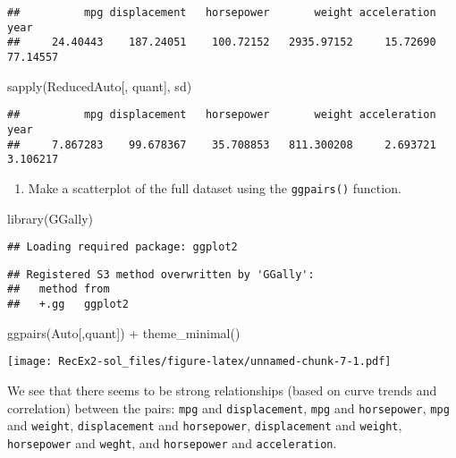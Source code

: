 \documentclass[
]{article}
\newenvironment{Shaded}{\begin{snugshade}}{\end{snugshade}}
\newcommand{\FunctionTok}[1]{\textcolor[rgb]{0.00,0.00,0.00}{#1}}
\newcommand{\NormalTok}[1]{#1}
\newcommand{\SpecialCharTok}[1]{\textcolor[rgb]{0.00,0.00,0.00}{#1}}
\providecommand{\tightlist}{%
  \setlength{\itemsep}{0pt}\setlength{\parskip}{0pt}}
\begin{document}
\begin{verbatim}
##          mpg displacement   horsepower       weight acceleration         year 
##     24.40443    187.24051    100.72152   2935.97152     15.72690     77.14557
\end{verbatim}

\begin{Shaded}
\begin{Highlighting}[]
\FunctionTok{sapply}\NormalTok{(ReducedAuto[, quant], sd)}
\end{Highlighting}
\end{Shaded}

\begin{verbatim}
##          mpg displacement   horsepower       weight acceleration         year 
##     7.867283    99.678367    35.708853   811.300208     2.693721     3.106217
\end{verbatim}

\begin{enumerate}
\def\labelenumi{\alph{enumi})}
\setcounter{enumi}{4}
\tightlist
\item
  Make a scatterplot of the full dataset using the \texttt{ggpairs()}
  function.
\end{enumerate}

\begin{Shaded}
\begin{Highlighting}[]
\FunctionTok{library}\NormalTok{(GGally)}
\end{Highlighting}
\end{Shaded}

\begin{verbatim}
## Loading required package: ggplot2
\end{verbatim}

\begin{verbatim}
## Registered S3 method overwritten by 'GGally':
##   method from   
##   +.gg   ggplot2
\end{verbatim}

\begin{Shaded}
\begin{Highlighting}[]
\FunctionTok{ggpairs}\NormalTok{(Auto[,quant]) }\SpecialCharTok{+} \FunctionTok{theme\_minimal}\NormalTok{()}
\end{Highlighting}
\end{Shaded}

\texttt{[image: RecEx2-sol\_files/figure-latex/unnamed-chunk-7-1.pdf]}

We see that there seems to be strong relationships (based on curve
trends and correlation) between the pairs: \texttt{mpg} and
\texttt{displacement}, \texttt{mpg} and \texttt{horsepower},
\texttt{mpg} and \texttt{weight}, \texttt{displacement} and
\texttt{horsepower}, \texttt{displacement} and \texttt{weight},
\texttt{horsepower} and \texttt{weght}, and \texttt{horsepower} and
\texttt{acceleration}.
\end{document}
